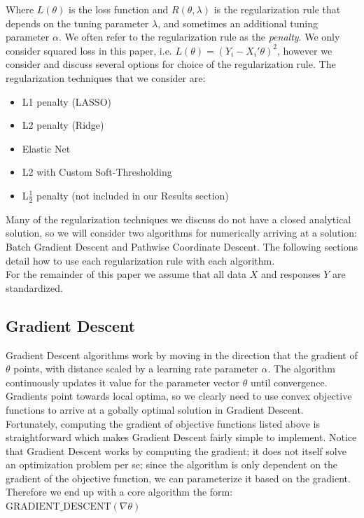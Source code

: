 \documentclass[11pt]{article}
\begin{document}
Where $L(\theta)$ is the loss function and $R(\theta,\lambda)$ is the regularization rule that depends on the tuning parameter $\lambda$, and sometimes an additional tuning parameter $\alpha$.  We often refer to the regularization rule as the \textit{penalty}.  We only consider squared loss in this paper, i.e. $L(\theta)= (Y_i - X_i'\theta)^2$, however we consider and discuss several options for choice of the regularization rule.  The regularization techniques that we consider are:
\begin{itemize}
	\item L1 penalty (LASSO)
	\item L2 penalty (Ridge)
	\item Elastic Net
	\item L2 with Custom Soft-Thresholding
	\item L$\frac{1}{2}$ penalty (not included in our Results section)
\end{itemize}

Many of the regularization techniques we discuss do not have a closed analytical solution, so we will consider two algorithms for numerically arriving at a solution: Batch Gradient Descent and Pathwise Coordinate Descent.  The following sections detail how to use each regularization rule with each algorithm.  \\

For the remainder of this paper we assume that all data $X$ and responses $Y$ are standardized.  

\subsection{Gradient Descent}
Gradient Descent algorithms work by moving in the direction that the gradient of $\theta$ points, with distance scaled by a learning rate parameter $\alpha$.  The algorithm continuously updates it value for the parameter vector $\theta$ until convergence.  Gradients point towards local optima, so we clearly need to use convex objective functions to arrive at a gobally optimal solution in Gradient Descent.  Fortunately, computing the gradient of objective functions listed above is straightforward which makes Gradient Descent fairly simple to implement.  Notice that Gradient Descent works by computing the gradient; it does not itself solve an optimization problem per se; since the algorithm is only dependent on the gradient of the objective function, we can parameterize it based on the gradient.  Therefore we end up with a core algorithm the form: $\text{GRADIENT\_DESCENT}(\nabla\theta)$
\end{document}
